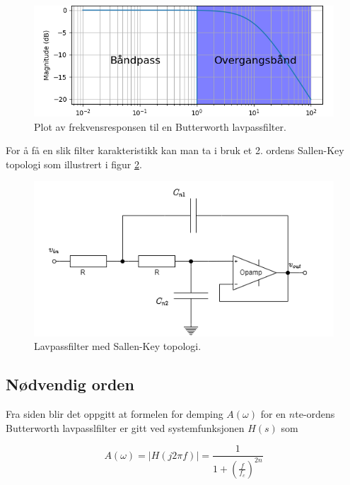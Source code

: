 \begin{figure}[!hbt]
	\centering
	\includegraphics[scale=0.7]{./Images/02Concept/02filter.png}
	\caption{Plot av frekvensresponsen til en Butterworth lavpassfilter.}
	\label{fig:03frekvensresponsButterworth}
\end{figure}

For å få en slik filter karakteristikk kan man ta i bruk et 2. ordens Sallen-Key topologi som illustrert i figur \ref{fig:04SallenKey}.

\begin{figure}[!hbt]
	\centering
	\includegraphics[scale=0.7]{./Images/02Concept/03SallenKey.png}
	\caption{Lavpassfilter med Sallen-Key topologi.}
	\label{fig:04SallenKey}
\end{figure}

\subsection{Nødvendig orden}
\label{sec:Nødvendig_orden}

Fra siden \cite{wikipediacontributors_2022_butterworth} blir det oppgitt at formelen for demping $A(\omega)$ for en $n$te-ordens Butterworth lavpasslfilter er gitt ved systemfunksjonen $H(s)$ som

\begin{equation}
	A(\omega)=|H(j2\pi f)|=\frac{1}{1+(\frac{f}{f_c})^{2n}}
	\label{eq:magnitude}
\end{equation}


